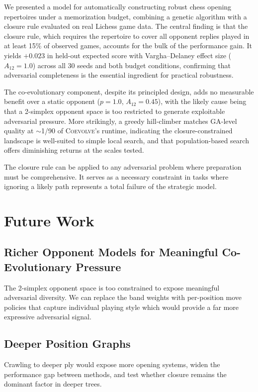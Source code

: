 \documentclass[conference]{IEEEtran}
\begin{document}
We presented a model for automatically constructing robust chess opening repertoires under a memorization budget, combining a genetic algorithm with a closure rule evaluated on real Lichess game data. The central finding is that the closure rule, which requires the repertoire to cover all opponent replies played in at least 15\% of observed games, accounts for the bulk of the performance gain. It yields $+0.023$ in held-out expected score with Vargha–Delaney effect size ($A_{12} = 1.0$) across all 30 seeds and both budget conditions, confirming that adversarial completeness is the
essential ingredient for practical robustness.

The co-evolutionary component, despite its principled design, adds no
measurable benefit over a static opponent ($p = 1.0$, $A_{12} = 0.45$),
with the likely cause being that a 2-simplex opponent space is too restricted
to generate exploitable adversarial pressure. More strikingly, a greedy
hill-climber matches GA-level quality at $\sim$1/90 of \textsc{Coevolve}'s
runtime, indicating the closure-constrained landscape is well-suited to
simple local search, and that population-based search offers diminishing returns at the scales tested.

The closure rule can be applied to any adversarial problem where preparation must be comprehensive. It serves as a necessary constraint in tasks where ignoring a likely path represents a total failure of the strategic model.


\section{Future Work}
\label{sec:future}

\subsection{Richer Opponent Models for Meaningful Co-Evolutionary Pressure}
The 2-simplex opponent space is too constrained to expose meaningful
adversarial diversity. We can replace the band weights with per-position move policies that capture individual playing style which would provide a far more expressive adversarial signal.

\subsection{Deeper Position Graphs}
Crawling to deeper ply would expose more opening systems, widen the performance gap between methods, and test whether closure remains the dominant factor in deeper trees.
\end{document}
